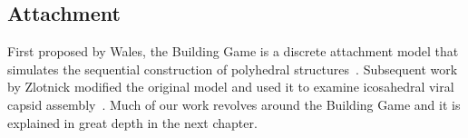 \subsection{Attachment}

First proposed by Wales, the Building Game is a discrete attachment model that simulates the sequential construction of polyhedral structures~\cite{Wales1987}. Subsequent work by Zlotnick modified the original model and used it to examine icosahedral viral capsid assembly~\cite{Zlotnick1994, Endres2005}. Much of our work revolves around the Building Game and it is explained in great depth in the next chapter.



%
%
%
